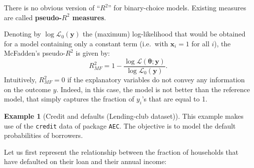 \documentclass[
  12pt,
]{book}
\newenvironment{Shaded}{\begin{snugshade}}{\end{snugshade}}
\newcommand{\AttributeTok}[1]{\textcolor[rgb]{0.77,0.63,0.00}{#1}}
\newcommand{\DecValTok}[1]{\textcolor[rgb]{0.00,0.00,0.81}{#1}}
\newcommand{\FunctionTok}[1]{\textcolor[rgb]{0.00,0.00,0.00}{#1}}
\newcommand{\NormalTok}[1]{#1}
\newcommand{\OtherTok}[1]{\textcolor[rgb]{0.56,0.35,0.01}{#1}}
\newcommand{\SpecialCharTok}[1]{\textcolor[rgb]{0.00,0.00,0.00}{#1}}
\newcommand{\StringTok}[1]{\textcolor[rgb]{0.31,0.60,0.02}{#1}}
\theoremstyle{definition}
\theoremstyle{definition}
\newtheorem{example}{Example}[chapter]
\theoremstyle{definition}
\theoremstyle{definition}
\theoremstyle{remark}
\begin{document}
There is no obvious version of ``\(R^2\)'' for binary-choice models. Existing measures are called \textbf{pseudo-\(R^2\) measures}.

Denoting by \(\log \mathcal{L}_0(\mathbf{y})\) the (maximum) log-likelihood that would be obtained for a model containing only a constant term (i.e.~with \(\mathbf{x}_i = 1\) for all \(i\)), the McFadden's pseudo-\(R^2\) is given by:
\[
R^2_{MF} = 1 - \frac{\log \mathcal{L}(\boldsymbol\theta;\mathbf{y})}{\log \mathcal{L}_0(\mathbf{y})}.
\]
Intuitively, \(R^2_{MF}=0\) if the explanatory variables do not convey any information on the outcome \(y\). Indeed, in this case, the model is not better than the reference model, that simply captures the fraction of \(y_i\)'s that are equal to 1.

\begin{example}[Credit and defaults (Lending-club dataset)]
\protect\hypertarget{exm:creditProbit}{}\label{exm:creditProbit}This example makes use of the \texttt{credit} data of package \texttt{AEC}. The objective is to model the default probabilities of borrowers.

Let us first represent the relationship between the fraction of households that have defaulted on their loan and their annual income:

\begin{Shaded}
\end{Shaded}


\end{example}
\end{document}
